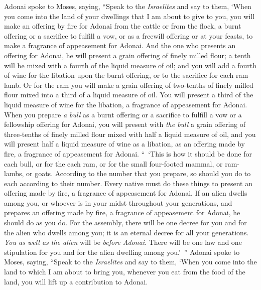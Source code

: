 \begin{biblechapter} %
 Adonai spoke to Moses, saying,
\verse “Speak to the \textit{Israelites} and say to them, ‘When you come into the land of your dwellings that I am about to give to you,
\verse you will make an offering by fire for Adonai from the cattle or from the flock, a burnt offering or a sacrifice to fulfill a vow, or as a freewill offering or at your feasts, to make a fragrance of appeasement for Adonai.
\verse And the one who presents an offering for Adonai, he will present a grain offering of finely milled flour; a tenth will be mixed with a fourth of the liquid measure of oil;
\verse and you will add a fourth of wine for the libation upon the burnt offering, or to the sacrifice for each ram-lamb.
\verse Or for the ram you will make a grain offering of two-tenths of finely milled flour mixed into a third of a liquid measure of oil.
\verse You will present a third of the liquid measure of wine for the libation, a fragrance of appeasement for Adonai.
\verse When you prepare \textit{a bull} as a burnt offering or a sacrifice to fulfill a vow or a fellowship offering for Adonai,
\verse you will present with \textit{the bull} a grain offering of three-tenths of finely milled flour mixed with half a liquid measure of oil,
\verse and you will present half a liquid measure of wine as a libation, as an offering made by fire, a fragrance of appeasement for Adonai.
\verse “ ‘This is how it should be done for each bull, or for the each ram, or for the small four-footed mammal, or ram-lambs, or goats.
\verse According to the number that you prepare, so should you do to each according to their number.
\verse Every native must do these things to present an offering made by fire, a fragrance of appeasement for Adonai.
\verse If an alien dwells among you, or whoever is in your midst throughout your generations, and prepares an offering made by fire, a fragrance of appeasement for Adonai, he should do as you do.
\verse For the assembly, there will be one decree for you and for the alien who dwells among you; it is an eternal decree for all your generations. \textit{You as well as the alien} will be \textit{before Adonai}.
\verse There will be one law and one stipulation for you and for the alien dwelling among you.’ ”
\verse Adonai spoke to Moses, saying,
\verse “Speak to the \textit{Israelites} and say to them, ‘When you come into the land to which I am about to bring you,
\verse whenever you eat from the food of the land, you will lift up a contribution to Adonai.

\end{biblechapter}
